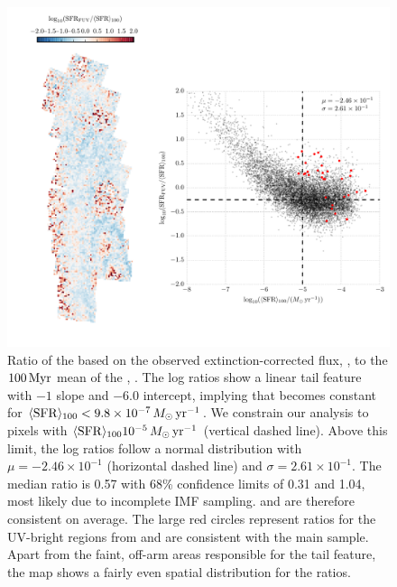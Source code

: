 \documentclass[iop, tighten]{emulateapj}
\begin{document}
\begin{figure}
\centering
\includegraphics[width=\textwidth]{m31flux-figures/sfr_fuv-vs-mean.pdf}
\caption[Ratio of the \sfr{} based on the observed extinction-corrected \fuv{}
flux to the $100\myr$ mean \sfr{}.]{Ratio of the \sfr{} based on the observed
    extinction-corrected \fuv{} flux, \sfrfuv{}, to the $100\myr$ mean of the
    \sfh{}, \sfroneh{}. The log \sfr{} ratios show a linear tail feature with
    $-1$ slope and $-6.0$ intercept, implying that \sfrfuv{} becomes constant
    for $\langle\mathrm{SFR}\rangle_{100} < 9.8\times 10^{-7}\,M_\odot\,\mathrm{yr}^{-1}$. We constrain our analysis
    to pixels with $\langle\mathrm{SFR}\rangle_{100}10^{-5}\,M_\odot\,\mathrm{yr}^{-1}$ (vertical dashed line). Above
    this limit, the log \sfr{} ratios follow a normal distribution with $\mu =
    -2.46\times 10^{-1}$ (horizontal dashed line) and $\sigma = 2.61\times
    10^{-1}$. The median ratio is 0.57 with 68\% confidence limits of 0.31 and
    1.04, most likely due to incomplete IMF sampling. \sfrfuv{} and \sfroneh{}
    are therefore consistent on average. The large red circles represent \sfr{}
    ratios for the UV-bright regions from \citet{Simones:2014} and are
    consistent with the main sample. Apart from the faint, off-arm areas
    responsible for the tail feature, the map shows a fairly even spatial
    distribution for the \sfr{} ratios.
}
\label{fig:mfx:fuvsfrratio}
\end{figure}
\end{document}
